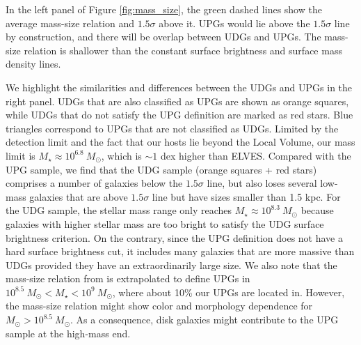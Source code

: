 \documentclass[twocolumn,astrosymb,twocolappendix]{aastex631}
\begin{document}
\begin{CJK*}{UTF8}{gbsn}
In the left panel of Figure \ref{fig:mass_size}, the green dashed lines show the average mass-size relation and $1.5\sigma$ above it. UPGs would lie above the $1.5\sigma$ line by construction, and there will be overlap between UDGs and UPGs. The mass-size relation is shallower than the constant surface brightness and surface mass density lines. 

We highlight the similarities and differences between the UDGs and UPGs in the right panel. UDGs that are also classified as UPGs are shown as orange squares, while UDGs that do not satisfy the UPG definition are marked as red stars. Blue triangles correspond to UPGs that are not classified as UDGs. Limited by the detection limit and the fact that our hosts lie beyond the Local Volume, our mass limit is $M_\star \approx 10^{6.8}\ M_\odot$, which is $\sim 1$ dex higher than ELVES. 
Compared with the UPG sample, we find that the UDG sample (orange squares + red stars) comprises a number of galaxies below the $1.5\sigma$ line, but also loses several low-mass galaxies that are above $1.5\sigma$ line but have sizes smaller than 1.5 kpc. For the UDG sample, the stellar mass range only reaches $M_\star\approx 10^{8.3}\ M_\odot$ because galaxies with higher stellar mass are too bright to satisfy the UDG surface brightness criterion. On the contrary, since the UPG definition does not have a hard surface brightness cut, it includes many galaxies that are more massive than UDGs provided they have an extraordinarily large size. We also note that the mass-size relation from \citet{ELVES-I} is extrapolated to define UPGs in $10^{8.5}\ M_\odot < M_\star < 10^9\ M_\odot$, where about 10\% our UPGs are located in. However, the mass-size relation might show color and morphology dependence for $M_\odot > 10^{8.5}\ M_\odot$. As a consequence, disk galaxies might contribute to the UPG sample at the high-mass end. 



\end{CJK*}
\end{document}
